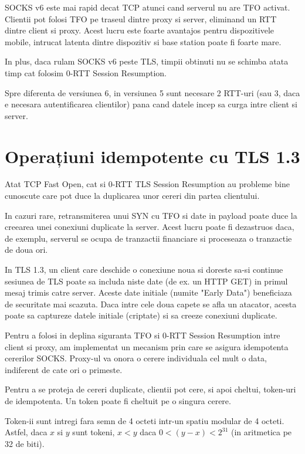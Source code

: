SOCKS v6 este mai rapid decat TCP atunci cand serverul nu are TFO activat.
Clientii pot folosi TFO pe traseul dintre proxy si server, eliminand un RTT dintre client si proxy.
Acest lucru este foarte avantajos pentru dispozitivele mobile, intrucat latenta dintre dispozitiv si base station
poate fi foarte mare.

In plus, daca rulam SOCKS v6 peste TLS, timpii obtinuti nu se schimba atata timp cat folosim 0-RTT Session Resumption.

Spre diferenta de versiunea 6, in versiunea 5 sunt necesare 2 RTT-uri (sau 3, daca e necesara autentificarea clientilor)
pana cand datele incep sa curga intre client si server.

\section{Operațiuni idempotente cu TLS 1.3}

Atat TCP Fast Open, cat si 0-RTT TLS Session Resumption au probleme bine cunoscute care pot duce la duplicarea unor
cereri din partea clientului.

In cazuri rare, retransmiterea unui SYN cu TFO si date in payload poate duce la creearea unei conexiuni duplicate la server.
Acest lucru poate fi dezastruos daca, de exemplu, serverul se ocupa de tranzactii financiare si proceseaza o tranzactie de doua ori.

In TLS 1.3, un client care deschide o conexiune noua si doreste sa-si continue sesiunea de TLS poate sa includa niste date (de ex. un HTTP GET)
in primul mesaj trimis catre server. Aceste date initiale (numite "Early Data") beneficiaza de securitate mai scazuta.
Daca intre cele doua capete se afla un atacator, acesta poate sa captureze datele initiale (criptate) si sa creeze conexiuni duplicate.

Pentru a folosi in deplina siguranta TFO si 0-RTT Session Resumption intre client si proxy, am implementat un mecanism
prin care se asigura idempotenta cererilor SOCKS. Proxy-ul va onora o cerere individuala cel mult o data, indiferent de cate
ori o primeste.

Pentru a se proteja de cereri duplicate, clientii pot cere, si apoi cheltui, token-uri de idempotenta. Un token poate fi cheltuit pe o singura cerere.

Token-ii sunt intregi fara semn de 4 octeti intr-un spatiu modular de 4 octeti. Astfel, daca \(x\) si \(y\) sunt tokeni, \(x < y\) daca \( 0 < (y - x) < 2^{31} \) (in aritmetica pe 32 de biti).

